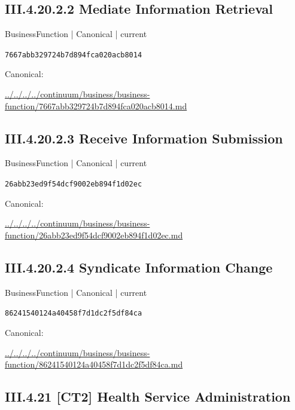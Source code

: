 \documentclass[10pt,a4paper]{article}
\begin{document}
\subsection*{III.4.20.2.2 Mediate Information Retrieval}
{\small BusinessFunction | Canonical | current}\par
\texttt{7667abb329724b7d894fca020acb8014}\par
Canonical: \par
{\footnotesize\url{../../../../continuum/business/business-function/7667abb329724b7d894fca020acb8014.md}}\par
\subsection*{III.4.20.2.3 Receive Information Submission}
{\small BusinessFunction | Canonical | current}\par
\texttt{26abb23ed9f54dcf9002eb894f1d02ec}\par
Canonical: \par
{\footnotesize\url{../../../../continuum/business/business-function/26abb23ed9f54dcf9002eb894f1d02ec.md}}\par
\subsection*{III.4.20.2.4 Syndicate Information Change}
{\small BusinessFunction | Canonical | current}\par
\texttt{86241540124a40458f7d1dc2f5df84ca}\par
Canonical: \par
{\footnotesize\url{../../../../continuum/business/business-function/86241540124a40458f7d1dc2f5df84ca.md}}\par
\subsection*{III.4.21 [CT2] Health Service Administration}
\end{document}
